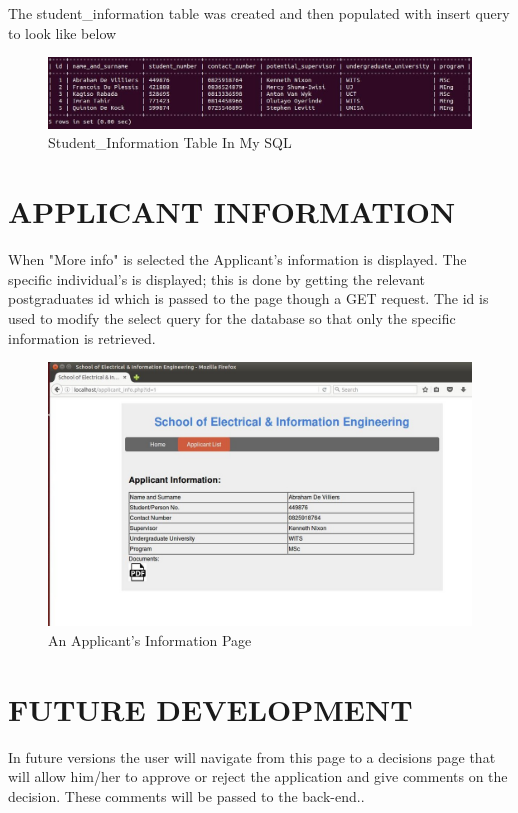 \documentclass[journal,comsoc,onecolumn]{IEEEtran}
\begin{document}
The student\_information table was created and then populated with insert query to look like below

\begin{figure}[h]
\centering
\includegraphics[width=0.7\linewidth]{mysql}
\caption{Student\_Information Table In My SQL}
\label{fig:mysql}
\end{figure}

\newpage
\section{APPLICANT INFORMATION}
When "More info" is selected the Applicant's information is displayed. The specific individual's is displayed; this is done by getting the relevant postgraduates id which is passed to the page though a GET request. The id is used to modify the select query for the database so that only the specific information is retrieved. 

\begin{figure}[h]
\centering
\includegraphics[width=0.7\linewidth]{information}
\caption{An Applicant's Information Page}
\label{fig:information}
\end{figure}





\section{FUTURE DEVELOPMENT}
In future versions the user will navigate from this page to a decisions page that will allow him/her to approve or reject the application and give comments on the decision. These comments will be passed to the back-end..
\end{document}
